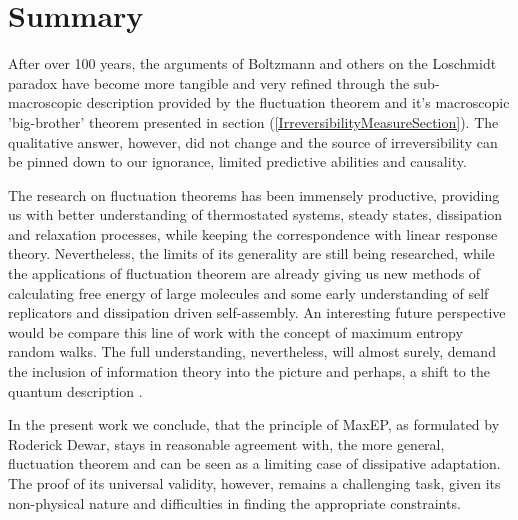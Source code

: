 \documentclass[a4paper,12pt]{article}
\begin{document}
\section{Summary}

After over 100 years, the arguments of Boltzmann and others on the Loschmidt paradox have become more tangible and very refined through the sub-macroscopic description provided by the fluctuation theorem and it's macroscopic 'big-brother' theorem presented in section (\ref{IrreversibilityMeasureSection}). The qualitative answer, however, did not change and the source of irreversibility can be pinned down to our ignorance, limited predictive abilities and causality.

The research on fluctuation theorems has been immensely productive, providing us with better understanding of thermostated systems, steady states, dissipation and relaxation processes, while keeping the correspondence with linear response theory. Nevertheless, the limits of its generality are still being researched, while the applications of fluctuation theorem are already giving us new methods of calculating free energy of large molecules and some early understanding of self replicators and dissipation driven self-assembly. 
An interesting future perspective would be compare this line of work with the concept of maximum entropy random walks.
The full understanding, nevertheless, will almost surely, demand the inclusion of information theory into the picture and perhaps, a shift to the quantum description \cite{Kurchan:2000uh}.

In the present work we conclude, that the principle of MaxEP, as formulated by Roderick Dewar, stays in reasonable agreement with, the more general, fluctuation theorem and can be seen as a limiting case of dissipative adaptation. The proof of its universal validity, however, remains a challenging task, given its non-physical nature and difficulties in finding the appropriate constraints.
  

\newpage



\end{document}
